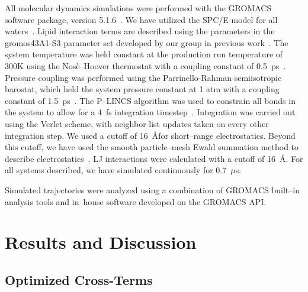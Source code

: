 All molecular dynamics simulations were performed with the GROMACS software package, 
version 5.1.6~\cite{abraham:2015,pall:2014,van:2005,lindahl:2001,berendsen:1995}.
We have utilized the SPC/E model for all waters~\cite{spce}. Lipid interaction
terms are described using the parameters in the gromos43A1-S3
parameter set developed by our group in previous work~\cite{chiu:2009}. 
The system temperature was held constant at the production run 
temperature of 300K using the Nos\`e--Hoover thermostat
with a coupling constant of 0.5~ps~\cite{nose:1983}. 
Pressure coupling was performed using the Parrinello-Rahman semiisotropic barostat,
which held the system pressure constant at 1 atm with a coupling
constant of 1.5~ps~\cite{parrinello:1981}. 
The P--LINCS algorithm was used to constrain all bonds in the system to allow for a 4~fs
integration timestep~\cite{lincs}. 
Integration was carried out using the Verlet scheme, 
with neighbor-list updates taken on every other integration step. 
We used a cutoff of 16~\AA for short--range electrostatics. 
Beyond this cutoff, we have used the smooth particle--mesh 
Ewald summation method to describe electrostatics~\cite{essmann:1995}. 
LJ interactions were calculated with a cutoff of 16~\AA. 
For all systems described, we have simulated continuously for 0.7~$\mu$s.

Simulated trajectories were analyzed using a combination of GROMACS
built--in analysis tools and in--house software developed on the
GROMACS API.

\section{Results and Discussion}

\subsection{Optimized Cross-Terms}

